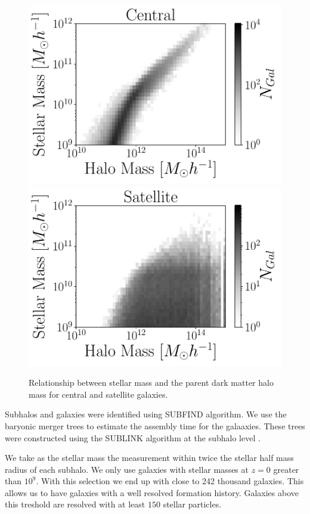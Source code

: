 \documentclass{aa}
\begin{document}
\begin{figure}
    \centering
     \includegraphics[width=0.9\columnwidth]{figuras/his2_centrales.pdf}
    \includegraphics[width=0.9\columnwidth]{figuras/his2_satelite.pdf}
    \caption{Relationship between stellar mass and the parent dark
      matter halo mass for central and satellite galaxies.} 
    \label{fig:stellar_to_halo}
\end{figure}



Subhalos and galaxies were identified using SUBFIND algorithm.
We use the baryonic merger trees to estimate the assembly time for the
galaaxies.
These trees were constructed using the SUBLINK algorithm at the
subhalo level \citep{2015MNRAS.449...49R}.

We take as the stellar mass the measurement within
twice the stellar half mass radius of each subhalo.
We only use galaxies with stellar masses at $z=0$ greater than
$10^{9}$\Msunh.
With this selection we end up with close to 242 thousand galaxies.
This allows us to have galaxies with a well resolved formation
history. 
Galaxies above this treshold are resolved with at least $150$ stellar
particles. 
\end{document}
